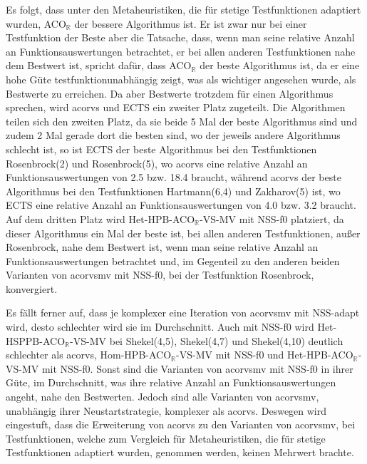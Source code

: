 \documentclass[fontsize=12, a4aper]{scrartcl}
\begin{document}
	Es folgt, dass unter den Metaheuristiken, die für stetige Testfunktionen adaptiert wurden, ACO\(_\mathbb{R}\) der bessere Algorithmus ist. Er ist zwar nur bei einer Testfunktion der Beste aber die Tatsache, dass, wenn man seine relative Anzahl an Funktionsauswertungen betrachtet, er bei allen anderen Testfunktionen nahe dem Bestwert ist, spricht dafür, dass ACO\(_\mathbb{R}\) der beste Algorithmus ist, da er eine hohe Güte testfunktionunabhängig zeigt, was als wichtiger angesehen wurde, als Bestwerte zu erreichen. Da aber Bestwerte trotzdem für einen Algorithmus sprechen, wird \ac{acorvs} und ECTS ein zweiter Platz zugeteilt. Die Algorithmen teilen sich den zweiten Platz, da sie beide 5 Mal der beste Algorithmus sind und zudem 2 Mal gerade dort die besten sind, wo der jeweils andere Algorithmus schlecht ist, so ist ECTS der beste Algorithmus bei den Testfunktionen \glqq Rosenbrock(2)\grqq{} und \glqq Rosenbrock(5)\grqq, wo \ac{acorvs} eine relative Anzahl an Funktionsauswertungen von 2.5 bzw. 18.4 braucht, während \ac{acorvs} der beste Algorithmus bei den Testfunktionen \glqq Hartmann(6,4)\grqq{} und \glqq Zakharov(5)\grqq{} ist, wo ECTS eine relative Anzahl an Funktionsauswertungen von 4.0 bzw. 3.2 braucht. Auf dem dritten Platz wird Het-HPB-ACO\(_\mathbb{R}\)-VS-MV mit NSS-f0 platziert, da dieser Algorithmus ein Mal der beste ist, bei allen anderen Testfunktionen, außer \glqq Rosenbrock\grqq{}, nahe dem Bestwert ist, wenn man seine relative Anzahl an Funktionsauswertungen betrachtet und, im Gegenteil zu den anderen beiden Varianten von \ac{acorvsmv} mit NSS-f0, bei der Testfunktion \glqq Rosenbrock\grqq{}, konvergiert.\hfill\newline
	
	Es fällt ferner auf, dass je komplexer eine Iteration von \ac{acorvsmv} mit NSS-adapt wird, desto schlechter wird sie im Durchschnitt. Auch mit NSS-f0 wird Het-HSPPB-ACO\(_\mathbb{R}\)-VS-MV bei \glqq Shekel(4,5)\grqq, \glqq Shekel(4,7)\grqq{} und \glqq Shekel(4,10)\grqq{} deutlich schlechter als \ac{acorvs}, Hom-HPB-ACO\(_\mathbb{R}\)-VS-MV mit NSS-f0 und Het-HPB-ACO\(_\mathbb{R}\)-VS-MV mit NSS-f0. Sonst sind die Varianten von \ac{acorvsmv} mit NSS-f0 in ihrer Güte, im Durchschnitt, was ihre relative Anzahl an Funktionsauswertungen angeht, nahe den Bestwerten. Jedoch sind alle Varianten von \ac{acorvsmv}, unabhängig ihrer Neustartstrategie, komplexer als \ac{acorvs}. Deswegen wird eingestuft, dass die Erweiterung von \ac{acorvs} zu den Varianten von \ac{acorvsmv}, bei Testfunktionen, welche zum Vergleich für Metaheuristiken, die für stetige Testfunktionen adaptiert wurden, genommen werden, keinen Mehrwert brachte.
	
\end{document}
